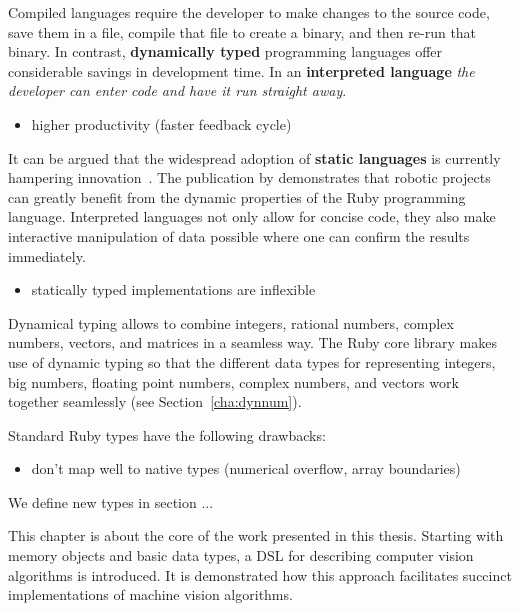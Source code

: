 \documentclass[10pt,a4paper,twoside,openright]{book}
\newcommand{\sex}[1]{Section~\ref{cha:#1}}
\begin{document}
\begin{footnotesize}
Compiled languages require the developer to make changes to the source code, save them in a file, compile that file to create a binary, and then re-run that binary. 
In contrast, \textbf{dynamically typed} programming languages offer considerable savings in development time. In an \textbf{interpreted language} \emph{the developer can enter code and have it run straight away}.
\end{footnotesize}
\begin{itemize}
\item higher productivity (faster feedback cycle)
\end{itemize}

\begin{footnotesize}
It can be argued that the widespread adoption of \textbf{static languages} is currently hampering innovation~\citep{RefWorks:311}. The publication by \citet{RefWorks:480} demonstrates that robotic projects can greatly benefit from the dynamic properties of the Ruby programming language. Interpreted languages not only allow for concise code, they also make interactive manipulation of data possible where one can confirm the results immediately.
\end{footnotesize}
\begin{itemize}
\item statically typed implementations are inflexible
\end{itemize}

\begin{footnotesize}
Dynamical typing allows to combine integers, rational numbers, complex numbers, vectors, and matrices in a seamless way.
The Ruby core library makes use of dynamic typing so that the different data types for representing integers, big numbers, floating point numbers, complex numbers, and vectors work together seamlessly (see \sex{dynnum}).
\end{footnotesize}

Standard Ruby types have the following drawbacks:
\begin{itemize}
\item don't map well to native types (numerical overflow, array boundaries)
\end{itemize}
We define new types in section ...

\begin{footnotesize}
This chapter is about the core of the work presented in this thesis. Starting with memory objects and basic data types, a \ac{DSL} for describing computer vision algorithms is introduced. It is demonstrated how this approach facilitates succinct implementations of machine vision algorithms.
\end{footnotesize}
\end{document}

